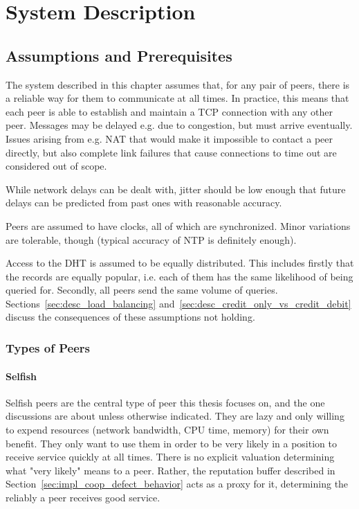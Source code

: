 \chapter{System Description}
\label{chap:system_description}
\section{Assumptions and Prerequisites}
The system described in this chapter assumes that, for any pair of peers, there
is a reliable way for them to communicate at all times. In practice, this means
that each peer is able to establish and maintain a TCP connection with any other
peer. Messages may be delayed e.g. due to congestion, but must arrive
eventually. Issues arising from e.g. NAT that would make it impossible to
contact a peer directly, but also complete link failures that cause connections
to time out are considered out of scope.

While network delays can be dealt with, jitter should be low enough that future
delays can be predicted from past ones with reasonable accuracy.

Peers are assumed to have clocks, all of which are synchronized. Minor
variations are tolerable, though (typical accuracy of NTP is definitely enough).

Access to the \ac{DHT} is assumed to be equally distributed. This includes
firstly that the records are equally popular, i.e. each of them has the same
likelihood of being queried for. Secondly, all peers send the same volume of
queries. Sections~\ref{sec:desc_load_balancing}
and~\ref{sec:desc_credit_only_vs_credit_debit} discuss the consequences of these
assumptions not holding.

\subsection{Types of Peers}
\subsubsection{Selfish}
Selfish peers are the central type of peer this thesis focuses on, and the one
discussions are about unless otherwise indicated. They are lazy and only willing
to expend resources (network bandwidth, CPU time, memory) for their own benefit.
They only want to use them in order to be very likely in a position to receive
service quickly at all times. There is no explicit valuation determining what
"very likely" means to a peer. Rather, the reputation buffer described in
Section~\ref{sec:impl_coop_defect_behavior} acts as a proxy for it, determining
the reliably a peer receives good service.

